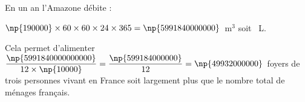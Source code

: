 
\medskip 

%
%
%
%
%
En un an l'Amazone débite :

$\np{190000} \times 60 \times 60 \times 24 \times 365 = \np{5991840000000}$~m$^3$ soit ~L.

Cela permet d'alimenter $\dfrac{\np{5991840000000000}}{12 \times \np{10000}} = \dfrac{\np{599184000000}}{12} =  \np{49932000000}$~foyers de trois personnes vivant en France soit largement plus que le nombre total de ménages français.

\bigskip

